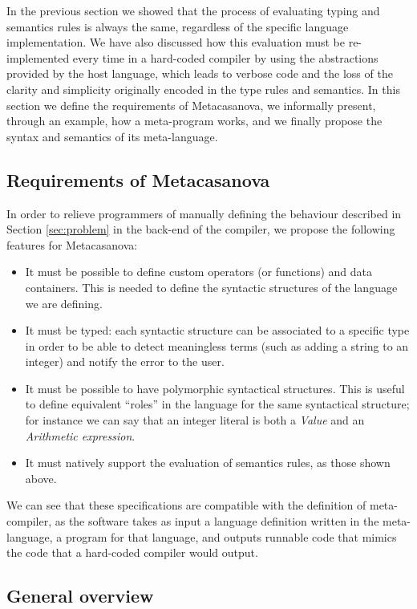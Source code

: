 In the previous section we showed that the process of evaluating typing and semantics rules is always the same, regardless of the specific language implementation. We have also discussed how this evaluation must be re-implemented every time in a hard-coded compiler by using the abstractions provided by the host language, which leads to verbose code and the loss of the clarity and simplicity originally encoded in the type rules and semantics. In this section we define the requirements of Metacasanova, we informally present, through an example, how a meta-program works, and we finally propose the syntax and semantics of its meta-language.

\subsection{Requirements of Metacasanova}
In order to relieve programmers of manually defining the behaviour described in Section \ref{sec:problem} in the back-end of the compiler, we propose the following features for Metacasanova:

\begin{itemize}
	\item It must be possible to define custom operators (or functions) and data containers. This is needed to define the syntactic structures of the language we are defining.
	\item It must be typed: each syntactic structure can be associated to a specific type in order to be able to detect meaningless terms (such as adding a string to an integer) and notify the error to the user.
	\item It must be possible to have polymorphic syntactical structures. This is useful to define equivalent ``roles'' in the language for the same syntactical structure; for instance we can say that an integer literal is both a \textit{Value} and an \textit{Arithmetic expression}.
	\item It must natively support the evaluation of semantics rules, as those shown above.
\end{itemize}

We can see that these specifications are compatible with the definition of meta-compiler, as the software takes as input a language definition written in the meta-language, a program for that language, and outputs runnable code that mimics the code that a hard-coded compiler would output.

\subsection{General overview}

